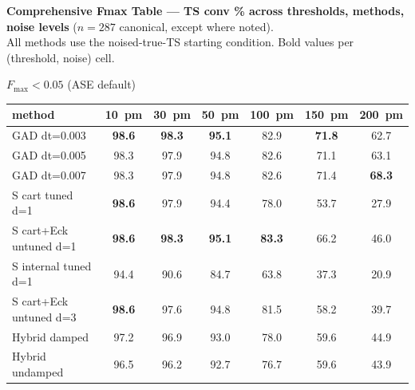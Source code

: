 \documentclass[11pt]{article}
\begin{document}
\begin{center}\footnotesize
\textbf{Comprehensive Fmax Table — TS conv \% across thresholds, methods, noise levels} ($n=287$ canonical, except where noted).\\[0.4em]
All methods use the noised-true-TS starting condition. Bold values per (threshold, noise) cell.
\end{center}

\begin{center}\footnotesize
\textbf{$F_\mathrm{max}<0.05$} (ASE default)\\[0.3em]
\begin{tabular}{l|cccccc}
\toprule
\textbf{method} & \textbf{10~pm} & \textbf{30~pm} & \textbf{50~pm} & \textbf{100~pm} & \textbf{150~pm} & \textbf{200~pm} \\
\midrule
GAD dt=0.003                   & \textbf{98.6} & \textbf{98.3} & \textbf{95.1} & 82.9 & \textbf{71.8} & 62.7 \\
GAD dt=0.005                   & 98.3 & 97.9 & 94.8 & 82.6 & 71.1 & 63.1 \\
GAD dt=0.007                   & 98.3 & 97.9 & 94.8 & 82.6 & 71.4 & \textbf{68.3} \\
\midrule
S cart tuned d=1               & \textbf{98.6} & 97.9 & 94.4 & 78.0 & 53.7 & 27.9 \\
S cart+Eck untuned d=1         & \textbf{98.6} & \textbf{98.3} & \textbf{95.1} & \textbf{83.3} & 66.2 & 46.0 \\
S internal tuned d=1           & 94.4 & 90.6 & 84.7 & 63.8 & 37.3 & 20.9 \\
S cart+Eck untuned d=3         & \textbf{98.6} & 97.6 & 94.8 & 81.5 & 58.2 & 39.7 \\
\midrule
Hybrid damped                  & 97.2 & 96.9 & 93.0 & 78.0 & 59.6 & 44.9 \\
Hybrid undamped                & 96.5 & 96.2 & 92.7 & 76.7 & 59.6 & 43.9 \\
\bottomrule
\end{tabular}
\end{center}
\end{document}
